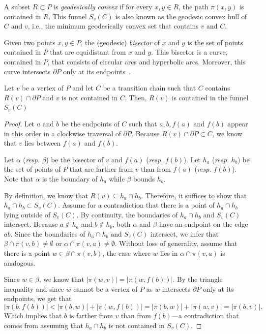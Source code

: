 \documentclass[a4paper,UKenglish]{lipics}
\newcommand{\fn}[2]{\ensuremath{S_{\scriptscriptstyle #1}(#2)}}
\newcommand{\ff}[1]{\ensuremath{f(#1)}}
\newcommand{\g}[2]{\ensuremath{|\pi(#1, #2)|}}
\newcommand{\p}[2]{\ensuremath{\pi(#1, #2)}}
\begin{document}
A subset $R\subset P$ is \emph{geodesically convex} if for every $x,y\in R$, the path $\p{x}{y}$ is contained in $R$.
This funnel $\fn{v}{C}$ is also known as the geodesic convex hull of $C$ and $v$, i.e., the minimum geodesically convex set that contains $v$ and $C$.

Given two points $x,y\in P$, the (geodesic) \emph{bisector} of $x$ and $y$ is the set of points contained in $P$ that are equidistant from $x$ and $y$. This bisector is a curve, contained in $P$, that consists of circular arcs and hyperbolic arcs. Moreover, this curve intersects $\partial P$ only at its endpoints~\cite[Lemma 3.22]{aronov1989geodesic}.

\begin{lemma}\label{lemma:Funnel contains Voronoi cell}
Let $v$ be a vertex of $P$ and let $C$ be a transition chain such that $C$ contains $R(v)\cap \partial P$ and $v$ is not contained in $C$.
Then, $R(v)$ is contained in the funnel $\fn{v}{C}$
\end{lemma}
\begin{proof}
Let $a$ and $b$ be the endpoints of $C$ such that $a,b, \ff{a}$ and $\ff{b}$ appear in this order in a clockwise traversal of $\partial P$.
Because $R(v)\cap \partial P\subset C$, we know that $v$ lies between $\ff{a}$ and $\ff{b}$.

Let $\alpha$ (\emph{resp.} $\beta$) be the bisector of $v$ and $\ff{a}$ (\emph{resp.} $\ff{b}$).
Let $h_a$ (\emph{resp.} $h_b$) be the set of points of $P$ that are farther from $v$ than from $\ff{a}$ (\emph{resp.} $\ff{b}$).
Note that $\alpha$ is the boundary of $h_a$ while $\beta$ bounds $h_b$.

By definition, we know that $R(v)\subseteq h_a\cap h_b$. Therefore, it suffices to show that $h_a\cap h_b\subset \fn{v}{C}$.
Assume for a contradiction that there is a point of $h_a\cap h_b$ lying outside of $\fn{v}{C}$. 
By continuity, the boundaries of $h_a\cap h_b$ and $\fn{v}{C}$ intersect.
Because $a\notin h_a$ and $b\notin h_b$, both $\alpha$ and $\beta$ have an endpoint on the edge $ab$.
Since the boundaries of $h_a\cap h_b$ and $\fn{v}{C}$ intersect, we infer that $\beta \cap \p{v}{b}\neq \emptyset$ or $\alpha \cap \p{v}{a}\neq \emptyset$.
Without loss of generality, assume that there is a point $w\in \beta \cap \p{v}{b}$, the case where $w$ lies in $\alpha \cap \p{v}{a}$ is analogous. 

Since $w\in \beta$, we know that $\g{w}{v} = \g{w}{ \ff{b}}$. By the triangle inequality and since $w$ cannot be a vertex of $P$ as $w$ intersects $\partial P$ only at its endpoints, we get that
$$\g{b}{\ff{b}} < \g{b}{w} + \g{w}{\ff{b}} = \g{b}{w} + \g{w}{v} = \g{b}{v}.$$
Which implies that $b$ is farther from $v$ than from $\ff{b}$---a contradiction that comes from assuming that $h_a\cap h_b$ is not contained in $\fn{v}{C}$.
\end{proof}
\end{document}
